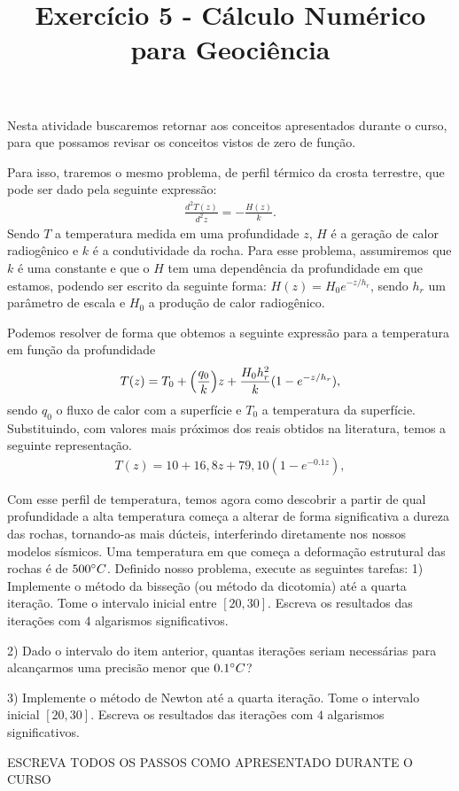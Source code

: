 \documentclass{article}
\title{Exercício 5  -  Cálculo Numérico para Geociência}
\begin{document}
\maketitle




Nesta atividade buscaremos retornar aos conceitos apresentados durante o curso, para que possamos revisar os conceitos vistos de zero de função.

Para isso, traremos o mesmo problema, de perfil térmico da crosta terrestre, que pode ser dado pela seguinte expressão:
\begin{align}
    \label{eq: EDO_crosta}
    \frac{d^2T(z)}{d^2z} = -\frac{H(z)}{k}.
\end{align}
Sendo $T$ a temperatura medida em uma profundidade $z$, $H$ é a geração de calor radiogênico e $k$ é a condutividade da rocha. Para esse problema, assumiremos que $k$ é uma constante e que o $H$ tem uma dependência da profundidade em que estamos, podendo ser escrito da seguinte forma: $H(z) = H_0e^{-z/h_r}$, sendo $h_r$ um parâmetro de escala e $H_0$ a produção de calor radiogênico.

Podemos resolver de forma que obtemos a seguinte expressão para a temperatura em função da profundidade
\begin{align}
    T(z) = T_0 + \qty(\frac{q_0}{k})z + \frac{H_0h_r^2}{k}(1-e^{-z/h_r}),
\end{align}
sendo $q_0$ o fluxo de calor com a superfície e $T_0$ a temperatura da superfície. Substituindo, com valores mais próximos dos reais obtidos na literatura, temos a seguinte representação.
\begin{align}
    T(z) = 10 + 16,8z + 79,10(1-e^{-0.1z}),
\end{align}


Com esse perfil de temperatura, temos agora como descobrir a partir de qual profundidade a alta temperatura começa a alterar de forma significativa a dureza das rochas, tornando-as mais dúcteis, interferindo diretamente nos nossos modelos sísmicos. Uma temperatura em que começa a deformação estrutural das rochas é de $500 \degree C$. Definido nosso problema, execute as seguintes tarefas:
\vspace{0.2 cm}
\hline 
\vspace{0.2 cm}
1) Implemente o método da bisseção (ou método da dicotomia) até a quarta iteração. Tome o intervalo inicial entre $[20,30]$. Escreva os resultados das iterações com $4$ algarismos significativos.

2) Dado o intervalo do item anterior, quantas iterações seriam necessárias para alcançarmos uma precisão menor que $0.1 \degree C$?

3) Implemente o método de Newton até a quarta iteração. Tome o intervalo inicial $[20,30]$. Escreva os resultados das iterações com $4$ algarismos significativos.

\vspace{2cm}
\noindent\centering\large{ESCREVA TODOS OS PASSOS COMO APRESENTADO DURANTE O CURSO}
\end{document}
